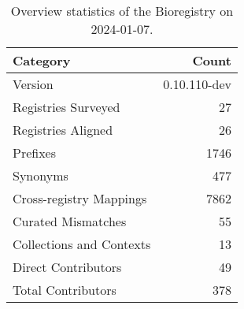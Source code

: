 \begin{table}
\caption{Overview statistics of the Bioregistry on 2024-01-07.}
\label{tab:bioregistry-summary}
\begin{tabular}{lr}
\toprule
Category & Count \\
\midrule
Version & 0.10.110-dev \\
Registries Surveyed & 27 \\
Registries Aligned & 26 \\
Prefixes & 1746 \\
Synonyms & 477 \\
Cross-registry Mappings & 7862 \\
Curated Mismatches & 55 \\
Collections and Contexts & 13 \\
Direct Contributors & 49 \\
Total Contributors & 378 \\
\bottomrule
\end{tabular}
\end{table}
